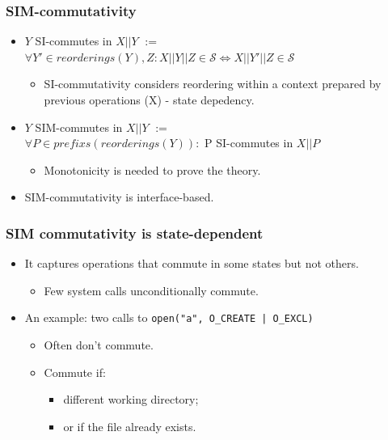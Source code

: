 \documentclass{beamer}
\begin{document}
\begin{frame}
\frametitle{SIM-commutativity}

\begin{itemize}
\item $Y$ SI-commutes in $X||Y$ $:=$ \\
  $\forall Y' \in reorderings(Y), Z: X||Y||Z \in \mathscr{S} 
  \Longleftrightarrow X||Y'||Z \in \mathscr{S} $

\begin{itemize}
\item SI-commutativity considers reordering within a context prepared by 
previous operations (X) - state depedency.
\end{itemize}

\item $Y$ SIM-commutes in $X||Y$ $:=$ \\
  $\forall P \in prefixs(reorderings(Y)):$ P SI-commutes in $X||P$
\begin{itemize}
\item Monotonicity is needed to prove the theory.
\end{itemize}
\item SIM-commutativity is interface-based.
\end{itemize}

\end{frame}

\begin{frame}
\frametitle{SIM commutativity is state-dependent}

\begin{itemize}
\item It captures operations that commute in some states but not others.
\begin{itemize}
\item Few system calls unconditionally commute.
\end{itemize}

\item An example: two calls to \texttt{open("a", O\_CREATE | O\_EXCL)}
  \begin{itemize}
    \item Often don't commute.
    \item Commute if:
      \begin{itemize}
        \item different working directory;
        \item or if the file already exists. 
        \end{itemize}
\end{itemize}
\end{itemize}
\end{frame}
\end{document}

